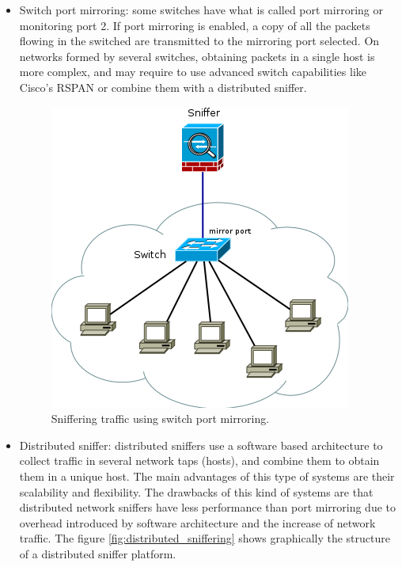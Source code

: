 \documentclass[thesis=M,english]{FITthesis}[2011/07/15]
\begin{document}
\begin{itemize}
\begin{figure}[h]
\caption{Sniffering traffic in the gateway links.}
\label{fig:gateway_sniffering}
\end{figure}
In those cases the only solution is to use distributed sniffers, port mirroring or a combination of both of them. Figure \ref{fig:gateway_sniffering} illustrates this technique with an example.
\item Switch port mirroring: some switches have what is called port mirroring or monitoring port 2. If port mirroring is enabled, a copy of all the packets flowing in the switched are transmitted to the mirroring port selected. On networks formed by several switches, obtaining packets in a single host is more complex, and may require to use advanced switch capabilities like Cisco’s RSPAN or combine them with a distributed sniffer.
\begin{figure}[h]
\centering
\includegraphics[scale=0.6]{images/mirror_sniffering.png}
\caption{Sniffering traffic using switch port mirroring.}
\label{fig:mirror_sniffering}
\end{figure}
\item Distributed sniffer: distributed sniffers use a software based architecture to collect traffic in several network taps (hosts), and combine them to obtain them in a unique host. The main advantages of this type of systems are their scalability and flexibility. The drawbacks of this kind of systems are that distributed network sniffers have less performance than port mirroring due to overhead introduced by software architecture and the increase of network traffic. The figure \ref{fig:distributed_sniffering} shows graphically the structure of a distributed sniffer platform.

\end{itemize}
\end{document}
